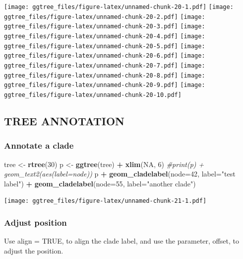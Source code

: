 \documentclass[]{article}
\newenvironment{Shaded}{\begin{snugshade}}{\end{snugshade}}
\newcommand{\KeywordTok}[1]{\textcolor[rgb]{0.13,0.29,0.53}{\textbf{#1}}}
\newcommand{\DataTypeTok}[1]{\textcolor[rgb]{0.13,0.29,0.53}{#1}}
\newcommand{\DecValTok}[1]{\textcolor[rgb]{0.00,0.00,0.81}{#1}}
\newcommand{\StringTok}[1]{\textcolor[rgb]{0.31,0.60,0.02}{#1}}
\newcommand{\CommentTok}[1]{\textcolor[rgb]{0.56,0.35,0.01}{\textit{#1}}}
\newcommand{\OtherTok}[1]{\textcolor[rgb]{0.56,0.35,0.01}{#1}}
\newcommand{\OperatorTok}[1]{\textcolor[rgb]{0.81,0.36,0.00}{\textbf{#1}}}
\newcommand{\NormalTok}[1]{#1}
\begin{document}
\texttt{[image: ggtree\_files/figure-latex/unnamed-chunk-20-1.pdf]}
\texttt{[image: ggtree\_files/figure-latex/unnamed-chunk-20-2.pdf]}
\texttt{[image: ggtree\_files/figure-latex/unnamed-chunk-20-3.pdf]}
\texttt{[image: ggtree\_files/figure-latex/unnamed-chunk-20-4.pdf]}
\texttt{[image: ggtree\_files/figure-latex/unnamed-chunk-20-5.pdf]}
\texttt{[image: ggtree\_files/figure-latex/unnamed-chunk-20-6.pdf]}
\texttt{[image: ggtree\_files/figure-latex/unnamed-chunk-20-7.pdf]}
\texttt{[image: ggtree\_files/figure-latex/unnamed-chunk-20-8.pdf]}
\texttt{[image: ggtree\_files/figure-latex/unnamed-chunk-20-9.pdf]}
\texttt{[image: ggtree\_files/figure-latex/unnamed-chunk-20-10.pdf]}

\subsection{TREE ANNOTATION}\label{tree-annotation}

\subsubsection{Annotate a clade}\label{annotate-a-clade}

\begin{Shaded}
\begin{Highlighting}[]
\NormalTok{tree <-}\StringTok{ }\KeywordTok{rtree}\NormalTok{(}\DecValTok{30}\NormalTok{)}
\NormalTok{p <-}\StringTok{ }\KeywordTok{ggtree}\NormalTok{(tree) }\OperatorTok{+}\StringTok{ }\KeywordTok{xlim}\NormalTok{(}\OtherTok{NA}\NormalTok{, }\DecValTok{6}\NormalTok{)}
\CommentTok{#print(p) + geom_text2(aes(label=node))}
\NormalTok{p }\OperatorTok{+}\StringTok{ }\KeywordTok{geom_cladelabel}\NormalTok{(}\DataTypeTok{node=}\DecValTok{42}\NormalTok{, }\DataTypeTok{label=}\StringTok{"test label"}\NormalTok{) }\OperatorTok{+}
\StringTok{  }\KeywordTok{geom_cladelabel}\NormalTok{(}\DataTypeTok{node=}\DecValTok{55}\NormalTok{, }\DataTypeTok{label=}\StringTok{"another clade"}\NormalTok{)}
\end{Highlighting}
\end{Shaded}

\texttt{[image: ggtree\_files/figure-latex/unnamed-chunk-21-1.pdf]}

\subsubsection{Adjust position}\label{adjust-position}

Use align = TRUE, to align the clade label, and use the parameter,
offset, to adjust the position.
\end{document}
